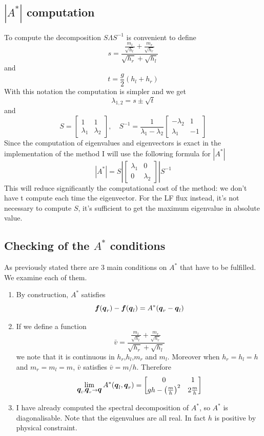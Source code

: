 \documentclass[oneside,12pt]{book}  %
\theoremstyle{plain}
\theoremstyle{definition}
\theoremstyle{remark}
\numberwithin{equation}{chapter} %
\begin{document}
\subsection{$|A^*|$ computation}
To compute the decomposition $S\Lambda S^{-1}$ is convenient to
define $$s=\frac{\frac{m_l}{\sqrt{h_l}}+\frac{m_r}{\sqrt{h_r}}
}{\sqrt{h_r}+\sqrt{h_l}} $$
and $$t=\frac{g}{2}(h_l+h_r)$$
With this notation the computation is simpler and we get 
\begin{equation}
  \label{eq:eigenvalues}
  \lambda_{1,2}=s \pm \sqrt{t}
\end{equation}
and
\begin{equation}
  \label{eq:s_matrix}
  S=\begin{bmatrix} 1 & 1\\
  \lambda_1& \lambda_2\end{bmatrix},\quad S^{-1}=\frac{1}{\lambda_1-\lambda_2}\begin{bmatrix} -\lambda_2 & 1\\
  \lambda_1& -1\end{bmatrix}
\end{equation}
Since the computation of eigenvalues and eigenvectors is exact in the
implementation of the method I will use the following formula for
$|A^*|$ 
\begin{equation}
  \label{eq:s_matrix}
  |A^*|=S \left | \begin{bmatrix} \lambda_1 & 0\\
   0 & \lambda_2\end{bmatrix}\right | S^{-1}
\end{equation}
This will reduce significantly the computational cost of the method:
we don't have t compute each time the eigenvector.
For the LF flux instead, it's not necessary to compute $S$, it's
sufficient to get the maximum eigenvalue in absolute value.

\subsection{Checking of the $A^*$ conditions}
As previously stated there are 3 main conditions on $A^*$ that have to
be fulfilled. We examine each of them.
\begin{enumerate}
\item
By construction, $A^*$
satisfies $${\mbox{\boldmath$f$}}({\mbox{\boldmath$q$}}_r)-{\mbox{\boldmath$f$}}({\mbox{\boldmath$q$}}_l)=A^*({\mbox{\boldmath$q$}}_r-{\mbox{\boldmath$q$}}_l)$$
\item
If we define a function $$\bar
v=\frac{\frac{m_l}{\sqrt{h_l}}+\frac{m_r}{\sqrt{h_r}}
}{\sqrt{h_r}+\sqrt{h_l}}$$ we note that it is continuous in
$h_r$,$h_l$,$m_r$ and $m_l$. Moreover when $h_r=h_l=h$ and $m_r=m_l=m$,
$\bar v$ satisfies $\bar v=m/h$. Therefore
$$\lim_{{\mbox{\boldmath$q$}}_l,{\mbox{\boldmath$q$}}_r \to {\mbox{\boldmath$q$}} }A^*({\mbox{\boldmath$q$}}_l,{\mbox{\boldmath$q$}}_r)=\begin{bmatrix} 0 & 1\\
  gh-\left(\frac{m}{h}\right)^2 & 2\frac{m}{h}\end{bmatrix} $$
\item
I have already computed the spectral decomposition of $A^*$, so $A^*$
is diagonalisable. Note that the eigenvalues are all real. In fact $h$
is positive by physical constraint.
\end{enumerate}
\end{document}
